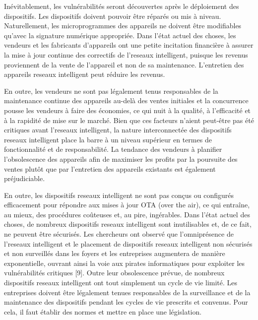 \documentclass[12pt]{report}
\begin{document}
Inévitablement, les vulnérabilités seront découvertes après le
déploiement des dispositifs. Les dispositifs doivent pouvoir être
réparés ou mis à niveau. Naturellement, les microprogrammes des
appareils ne doivent être modifiables qu'avec la signature numérique
appropriée. Dans l'état actuel des choses, les vendeurs et les
fabricants d'appareils ont une petite incitation financière à assurer la
mise à jour continue des correctifs de l'reseaux intelligent, puisque les revenus
proviennent de la vente de l'appareil et non de sa maintenance.
L'entretien des appareils reseaux intelligent peut réduire les revenus.

En outre, les vendeurs ne sont pas légalement tenus responsables de la maintenance
continue des appareils au-delà des ventes initiales et la concurrence
pousse les vendeurs à faire des économies, ce qui nuit à la qualité, à
l'efficacité et à la rapidité de mise sur le marché. Bien que ces
facteurs n'aient peut-être pas été critiques avant l'reseaux intelligent, la nature
interconnectée des dispositifs reseaux intelligent place la barre à un niveau supérieur
en termes de fonctionnalité et de responsabilité. La tendance des
vendeurs à planifier l'obsolescence des appareils afin de maximiser les
profits par la poursuite des ventes plutôt que par l'entretien des
appareils existants est également préjudiciable.

En outre, les dispositifs reseaux intelligent ne sont pas conçus ou configurés efficacement pour
répondre aux mises à jour OTA (over the air), ce qui entraîne, au mieux,
des procédures coûteuses et, au pire, ingérables. Dans l'état actuel des
choses, de nombreux dispositifs reseaux intelligent sont inutilisables et, de ce fait,
ne peuvent être sécurisés. Les chercheurs ont observé que l'omniprésence
de l'reseaux intelligent et le placement de dispositifs reseaux intelligent non sécurisés et non
surveillés dans les foyers et les entreprises augmentera de manière
exponentielle, ouvrant ainsi la voie aux pirates informatiques pour
exploiter les vulnérabilités critiques {[}9{]}. Outre leur obsolescence
prévue, de nombreux dispositifs reseaux intelligent ont tout simplement un cycle de vie
limité. Les entreprises doivent être légalement tenues responsables de
la surveillance et de la maintenance des dispositifs pendant les cycles
de vie prescrits et convenus. Pour cela, il faut établir des normes et
mettre en place une législation.
\end{document}
